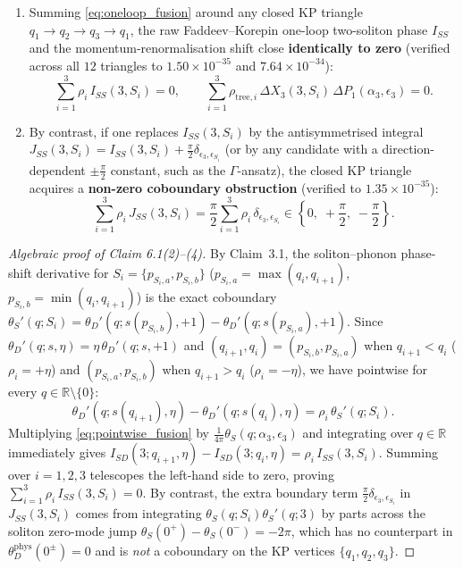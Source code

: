 \documentclass[11pt,a4paper]{article}
\begin{document}
{\begin{enumerate}
\item Summing \eqref{eq:oneloop_fusion} around any closed KP triangle
$q_1 \to q_2 \to q_3 \to q_1$, the raw Faddeev--Korepin one-loop two-soliton
phase $I_{SS}$ and the momentum-renormalisation shift close \textbf{identically
to zero} (verified across all $12$ triangles to $1.50\times 10^{-35}$ and
$7.64\times 10^{-34}$):
\begin{equation}\label{eq:triangle_closure}
  \sum_{i=1}^3 \rho_i\,I_{SS}(3,S_i) = 0, \qquad
  \sum_{i=1}^3 \rho_{\mathrm{tree},i}\,\Delta X_3(3,S_i)\,\Delta P_1(\alpha_3,\epsilon_3) = 0.
\end{equation}
\item By contrast, if one replaces $I_{SS}(3,S_i)$ by the antisymmetrised
integral $J_{SS}(3,S_i) = I_{SS}(3,S_i) + \frac{\pi}{2}\delta_{\epsilon_3,\epsilon_{S_i}}$
(or by any candidate with a direction-dependent $\pm\frac{\pi}{2}$ constant, such
as the $\Gamma$-ansatz), the closed KP triangle acquires a \textbf{non-zero
coboundary obstruction} (verified to $1.35\times 10^{-35}$):
\begin{equation}\label{eq:triangle_obstruction}
  \sum_{i=1}^3 \rho_i\,J_{SS}(3,S_i)
  = \frac{\pi}{2}\sum_{i=1}^3 \rho_i\,\delta_{\epsilon_3,\epsilon_{S_i}}
  \in \left\{0,\; +\frac{\pi}{2},\; -\frac{\pi}{2}\right\}.
\end{equation}
\end{enumerate}}

\begin{proof}[Algebraic proof of Claim 6.1(2)--(4)]
By Claim~3.1, the soliton--phonon phase-shift derivative for $S_i = \{p_{S_i,a},p_{S_i,b}\}$
($p_{S_i,a} = \max(q_i,q_{i+1})$, $p_{S_i,b} = \min(q_i,q_{i+1})$) is the exact
coboundary $\theta_S'(q;S_i) = \theta_D'(q;s(p_{S_i,b}),+1) - \theta_D'(q;s(p_{S_i,a}),+1)$.
Since $\theta_D'(q;s,\eta) = \eta\,\theta_D'(q;s,+1)$ and
$(q_{i+1},q_i) = (p_{S_i,b},p_{S_i,a})$ when $q_{i+1} < q_i$ ($\rho_i = +\eta$)
and $(p_{S_i,a},p_{S_i,b})$ when $q_{i+1} > q_i$ ($\rho_i = -\eta$), we have
pointwise for every $q \in \mathbb{R}\setminus\{0\}$:
\begin{equation}\label{eq:pointwise_fusion}
  \theta_D'(q;s(q_{i+1}),\eta) - \theta_D'(q;s(q_i),\eta) = \rho_i\,\theta_S'(q;S_i).
\end{equation}
Multiplying \eqref{eq:pointwise_fusion} by $\frac{1}{4\pi}\theta_S(q;\alpha_3,\epsilon_3)$
and integrating over $q \in \mathbb{R}$ immediately gives
$I_{SD}(3;q_{i+1},\eta) - I_{SD}(3;q_i,\eta) = \rho_i\,I_{SS}(3,S_i)$. Summing
over $i=1,2,3$ telescopes the left-hand side to zero, proving
$\sum_{i=1}^3\rho_i\,I_{SS}(3,S_i) = 0$. By contrast, the extra boundary term
$\frac{\pi}{2}\delta_{\epsilon_3,\epsilon_{S_i}}$ in $J_{SS}(3,S_i)$ comes from
integrating $\theta_S(q;S_i)\theta_S'(q;3)$ by parts across the soliton zero-mode
jump $\theta_S(0^+)-\theta_S(0^-)=-2\pi$, which has no counterpart in
$\theta_D^{\mathrm{phys}}(0^\pm)=0$ and is \emph{not} a coboundary on the KP
vertices $\{q_1,q_2,q_3\}$.
\end{proof}
\end{document}
